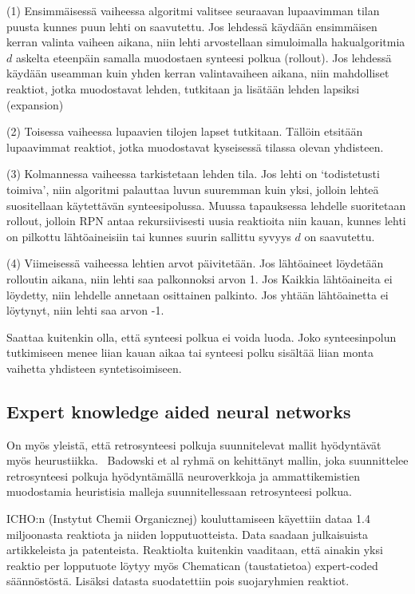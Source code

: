 \documentclass[finnish,twoside,censored,tkt,sw-line]{HYthesisML}
\begin{document}
(1) Ensimmäisessä vaiheessa algoritmi valitsee seuraavan lupaavimman tilan puusta kunnes puun lehti on saavutettu.
Jos lehdessä käydään ensimmäisen kerran valinta vaiheen aikana, niin lehti arvostellaan simuloimalla hakualgoritmia
$d$ askelta eteenpäin samalla muodostaen synteesi polkua (rollout). Jos lehdessä käydään useamman kuin yhden
kerran valintavaiheen aikana, niin mahdolliset reaktiot, jotka muodostavat lehden, tutkitaan ja lisätään lehden
lapsiksi (expansion)

(2) Toisessa vaiheessa lupaavien tilojen lapset tutkitaan. Tällöin etsitään lupaavimmat reaktiot, jotka muodostavat
kyseisessä tilassa olevan yhdisteen.

(3) Kolmannessa vaiheessa tarkistetaan lehden tila. Jos lehti on `todistetusti toimiva', niin algoritmi palauttaa
luvun suuremman kuin yksi, jolloin lehteä suositellaan käytettävän synteesipolussa. Muussa tapauksessa lehdelle
suoritetaan rollout, jolloin RPN antaa rekursiivisesti uusia reaktioita niin kauan, kunnes lehti on pilkottu
lähtöaineisiin tai kunnes suurin sallittu syvyys $d$ on saavutettu.

(4) Viimeisessä vaiheessa lehtien arvot päivitetään. Jos lähtöaineet löydetään rolloutin aikana, niin lehti saa
palkonnoksi arvon 1. Jos Kaikkia lähtöaineita ei löydetty, niin lehdelle annetaan osittainen palkinto. Jos yhtään
lähtöainetta ei löytynyt, niin lehti saa arvon -1.

Saattaa kuitenkin olla, että synteesi polkua ei voida luoda. Joko synteesinpolun tutkimiseen menee liian kauan
aikaa tai synteesi polku sisältää liian monta vaihetta yhdisteen syntetisoimiseen.

\subsection{Expert knowledge aided neural networks}

On myös yleistä, että retrosynteesi polkuja  suunnitelevat mallit hyödyntävät myös heurustiikka.~\cite{ExpertKnowledgeRetorsynthesis}
Badowski et al ryhmä on kehittänyt mallin, joka suunnittelee retrosynteesi polkuja hyödyntämällä neuroverkkoja ja ammattikemistien muodostamia heuristisia malleja suunnitellessaan retrosynteesi polkua.

ICHO:n (Instytut Chemii Organicznej) kouluttamiseen käyettiin dataa 1.4 miljoonasta reaktiota ja niiden lopputuotteista.
Data saadaan julkaisuista artikkeleista ja patenteista.
Reaktiolta kuitenkin vaaditaan, että ainakin yksi reaktio per lopputuote löytyy myös Chematican (taustatietoa) expert-coded säännöstöstä.
Lisäksi datasta suodatettiin pois suojaryhmien reaktiot.
\end{document}
